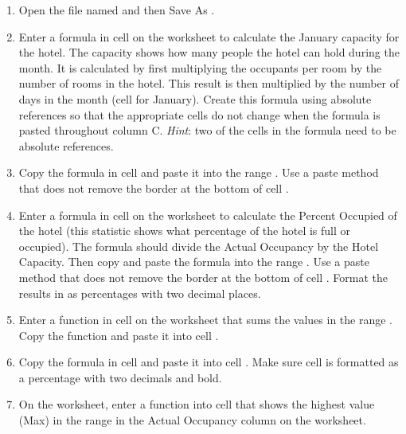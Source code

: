 \begin{enumerate}
	\item Open the file named  and then Save As .
	
	\item Enter a formula in cell  on the  worksheet to calculate the January capacity for the hotel. The capacity shows how many people the hotel can hold during the month. It is calculated by first multiplying the occupants per room by the number of rooms in the hotel. This result is then multiplied by the number of days in the month (cell  for January). Create this formula using absolute references so that the appropriate cells do not change when the formula is pasted throughout column C. \textit{Hint}: two of the cells in the formula need to be absolute references.
	
	\item Copy the formula in cell  and paste it into the range . Use a paste method that does not remove the border at the bottom of cell .
	
	\item Enter a formula in cell  on the  worksheet to calculate the Percent Occupied of the hotel (this statistic shows what percentage of the hotel is full or occupied). The formula should divide the Actual Occupancy by the Hotel Capacity. Then copy and paste the formula into the range . Use a paste method that does not remove the border at the bottom of cell . Format the results in  as percentages with two decimal places.
	
	\item Enter a function in cell  on the  worksheet that sums the values in the range . Copy the function and paste it into cell .
	
	\item Copy the formula in cell  and paste it into cell . Make sure cell  is formatted as a percentage with two decimals and bold.
	
	\item On the  worksheet, enter a function into cell  that shows the highest value (Max) in the range  in the Actual Occupancy column on the  worksheet.
	

\end{enumerate}
